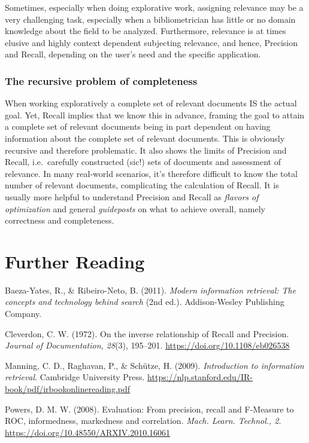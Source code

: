 \documentclass[
  letterpaper,
]{scrreprt}
\begin{document}
Sometimes, especially when doing explorative work, assigning relevance
may be a very challenging task, especially when a bibliometrician has
little or no domain knowledge about the field to be analyzed.
Furthermore, relevance is at times elusive and highly context dependent
subjecting relevance, and hence, Precision and Recall, depending on the
user's need and the specific application.

\subsubsection{The recursive problem of
completeness}\label{the-recursive-problem-of-completeness}

When working exploratively a complete set of relevant documents IS the
actual goal. Yet, Recall implies that we know this in advance, framing
the goal to attain a complete set of relevant documents being in part
dependent on having information about the complete set of relevant
documents. This is obviously recursive and therefore problematic. It
also shows the limits of Precision and Recall, i.e.~carefully
constructed (sic!) sets of documents and assessment of relevance. In
many real-world scenarios, it's therefore difficult to know the total
number of relevant documents, complicating the calculation of Recall. It
is usually more helpful to understand Precision and Recall as
\emph{flavors of optimization} and general \emph{guideposts} on what to
achieve overall, namely correctness and completeness.

\section{Further Reading}\label{further-reading-4}

Baeza-Yates, R., \& Ribeiro-Neto, B. (2011). \emph{Modern information
retrieval: The concepts and technology behind search} (2nd ed.).
Addison-Wesley Publishing Company.

Cleverdon, C. W. (1972). On the inverse relationship of Recall and
Precision. \emph{Journal of Documentation, 28}(3), 195--201.
\url{https://doi.org/10.1108/eb026538}

Manning, C. D., Raghavan, P., \& Schütze, H. (2009). \emph{Introduction
to information retrieval}. Cambridge University Press.
\url{https://nlp.stanford.edu/IR-book/pdf/irbookonlinereading.pdf}

Powers, D. M. W. (2008). Evaluation: From precision, recall and
F-Measure to ROC, informedness, markedness and correlation. \emph{Mach.
Learn. Technol., 2}. \url{https://doi.org/10.48550/ARXIV.2010.16061}
\end{document}
